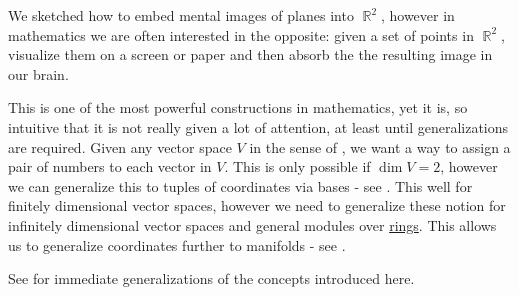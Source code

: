 \begin{remark}\label{rem:coordinate_systems}
  We sketched how to embed mental images of planes into \( \BbbR^2 \), however in mathematics we are often interested in the opposite: given a set of points in \( \BbbR^2 \), visualize them on a screen or paper and then absorb the the resulting image in our brain.

  This is one of the most powerful constructions in mathematics, yet it is, so intuitive that it is not really given a lot of attention, at least until generalizations are required. Given any vector space \( V \) in the sense of , we want a way to assign a pair of numbers to each vector in \( V \). This is only possible if \( \dim V = 2 \), however we can generalize this to tuples of coordinates via bases - see . This well for finitely dimensional vector spaces, however we need to generalize these notion for infinitely dimensional vector spaces and general modules over \hyperref[def:module]{rings}. This allows us to generalize coordinates further to manifolds - see .

  See  for immediate generalizations of the concepts introduced here.
\end{remark}
